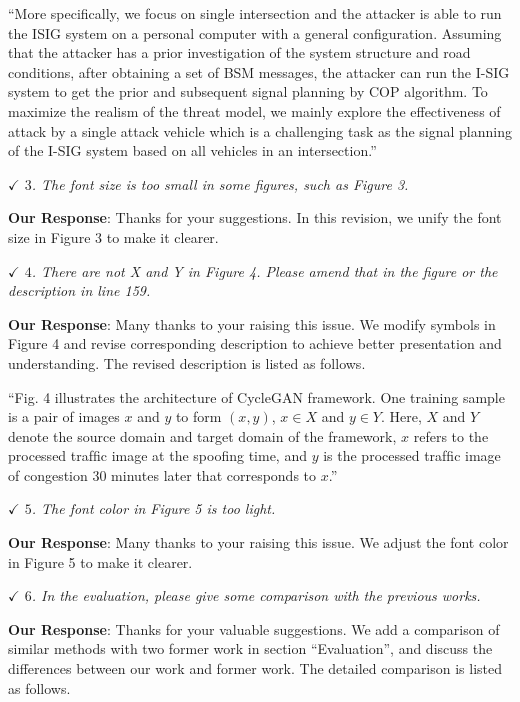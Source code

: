 \documentclass{amsart}
\theoremstyle{definition}
\theoremstyle{remark}
\numberwithin{equation}{section}
\begin{document}
``More specifically, we focus on single intersection and the attacker is able to run the ISIG system on a personal computer with a general configuration. Assuming that the attacker has a prior investigation of the system structure and road conditions, after obtaining a set of BSM messages, the attacker can run the I-SIG system to get the prior and subsequent signal planning by COP algorithm. To maximize the realism of the threat model, we mainly explore the effectiveness of attack by a single attack vehicle which is a challenging task as the signal planning of the I-SIG system based on all vehicles in an intersection.''


\emph{$\checkmark$ $3$. The font size is too small in some figures, such as Figure 3.}

\textbf{Our Response}:
Thanks for your suggestions. In this revision, we unify the font size in Figure 3 to make it clearer.


\emph{$\checkmark$ $4$. There are not X and Y in Figure 4. Please amend that in the figure or the description in line 159.}

\textbf{Our Response}: Many thanks to your raising this issue. We modify symbols in Figure 4 and revise corresponding description to achieve better presentation and understanding. The revised description is listed as follows.

``Fig. 4 illustrates the architecture of CycleGAN framework. One training sample is a pair of images $x$ and $y$ to form $(x,y)$, $x \in X$ and $y \in Y$. Here, $X$ and $Y$ denote the source domain and target domain of the framework, $x$ refers to the processed trafﬁc image at the spooﬁng time, and $y$ is the processed trafﬁc image of congestion 30 minutes later that corresponds to $x$.''


\emph{$\checkmark$ $5$. The font color in Figure 5 is too light.}

\textbf{Our Response}:
 Many thanks to your raising this issue. We adjust the font color in Figure 5 to make it clearer.


\emph{$\checkmark$ $6$. In the evaluation, please give some comparison with the previous works.}

\textbf{Our Response}:
Thanks for your valuable suggestions. We add a comparison of similar methods with two former work in section ``Evaluation'', and discuss the differences between our work and former work. The detailed comparison is listed as follows.
\end{document}
